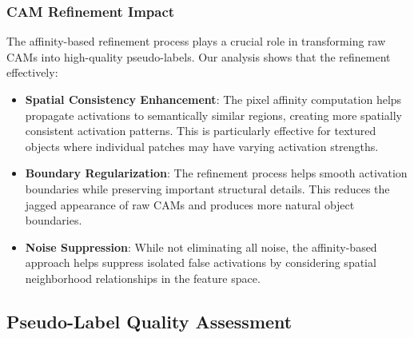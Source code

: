 \subsubsection{CAM Refinement Impact}
\label{subsubsec:cam_refinement}

The affinity-based refinement process plays a crucial role in transforming raw CAMs into high-quality pseudo-labels. Our analysis shows that the refinement effectively:

\begin{itemize}
    \item \textbf{Spatial Consistency Enhancement}: The pixel affinity computation helps propagate activations to semantically similar regions, creating more spatially consistent activation patterns. This is particularly effective for textured objects where individual patches may have varying activation strengths.
    
    \item \textbf{Boundary Regularization}: The refinement process helps smooth activation boundaries while preserving important structural details. This reduces the jagged appearance of raw CAMs and produces more natural object boundaries.
    
    \item \textbf{Noise Suppression}: While not eliminating all noise, the affinity-based approach helps suppress isolated false activations by considering spatial neighborhood relationships in the feature space.
\end{itemize}

\subsection{Pseudo-Label Quality Assessment}
\label{subsec:pseudolabel_analysis}

